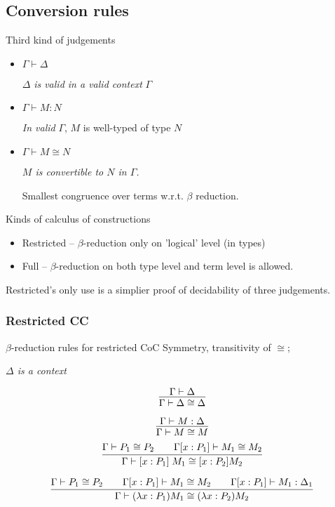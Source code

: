 \documentclass{beamer}
\begin{document}
\subsection{Conversion rules}

\begin{frame}{Third kind of judgements}

\begin{itemize}

\item $\Gamma \vdash \Delta$

$\Delta$ \textit{is valid in a valid context } $\Gamma$


\item $\Gamma \vdash M : N$

\textit{In valid } $\Gamma$, $M$ is well-typed of type $N$


\item $\Gamma \vdash M \cong N$

\textit{$M$ is convertible to $N$ in $\Gamma$.}

Smallest congruence over terms w.r.t. $\beta$ reduction. 

\end{itemize}
\end{frame}

\begin{frame}{Kinds of calculus of constructions}
\begin{itemize}
\item Restricted -- $\beta$-reduction only on 'logical' level (in types)
\item Full -- $\beta$-reduction on both type level and term level is allowed.
\end{itemize}


Restricted's only use is a simplier proof of decidability of three judgements.
\end{frame}


\subsubsection{Restricted CC}
\begin{frame}{$\beta$-reduction rules for restricted CoC}
Symmetry, transitivity of $\cong$;

\textit{$\Delta$ is a context}

$$\infer{\Gamma \vdash \Delta \cong \Delta}{\Gamma \vdash \Delta}$$

\pause
$$\infer{\Gamma \vdash M \cong M}{\Gamma \vdash M: \Delta}$$  
\pause
$$\infer{\Gamma \vdash [x:P_1] \; M_1 \cong [x : P_2] M_2} {\Gamma \vdash P_1 \cong P_2 & \quad \Gamma [x: P_1] \vdash M_1 \cong M_2 } $$
 
\pause
$$\infer{\Gamma \vdash (\lambda x:P_1) M_1 \cong (\lambda x : P_2) M_2} {\Gamma \vdash P_1 \cong P_2 & \quad \Gamma [x: P_1] \vdash M_1 \cong M_2 & \quad \Gamma [x: P_1] \vdash M_1 : \Delta_1} $$
 

\end{frame}
\end{document}
